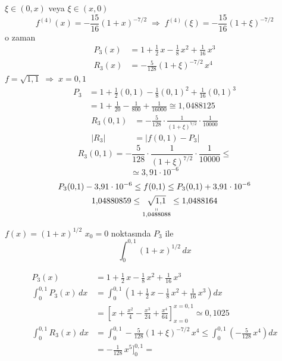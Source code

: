 \documentclass[11pt,a4paper]{article}
\begin{document}
\hfill $\xi \in (0,x)$ veya $\xi \in (x,0)$
\[
  f^{(4)}(x) = -\frac{15}{16}(1+x)^{-7/2} \;\Rightarrow\; f^{(4)}(\xi) = -\frac{15}{16}(1+\xi)^{-7/2}
\]
o zaman
\begin{align*}
  P_3(x) &= 1 + \frac{1}{2}\,x - \frac{1}{8}\,x^2 + \frac{1}{16}\,x^3\\
  R_3(x) &= -\frac{5}{128}(1+\xi)^{-7/2}\,x^4
\end{align*}
$f = \sqrt{1{,}1} \;\Rightarrow\; x = 0{,}1$
\begin{align*}
  P_3 &= 1 + \frac{1}{2}(0{,}1) - \frac{1}{8}(0{,}1)^2 + \frac{1}{16}(0{,}1)^3\\
      &= 1 + \frac{1}{20} - \frac{1}{800} + \frac{1}{16000} \cong 1{,}0488125
\end{align*}
\begin{align*}
  R_3(0{,}1) &= -\frac{5}{128}\cdot\frac{1}{(1+\xi)^{7/2}}\cdot\frac{1}{10000}\\
  |R_3| &= |f(0{,}1) - P_3|
\end{align*}
\[
  R_3(0{,}1) = -\frac{5}{128}\cdot\frac{1}{(1+\boxed{\xi})^{7/2}}\cdot\frac{1}{10000} \le
\]
\hspace*{0.3\linewidth}{\small $\swarrow$ 0 veriyoruz en büyük hatayı bulmak için}
\[
  \simeq 3{,}91\cdot10^{-6}
\]
\begin{gather*}
  P_3(0{,}1) - 3{,}91\cdot10^{-6} \le f(0{,}1) \le P_3(0{,}1) + 3{,}91\cdot10^{-6}\\
  1{,}04880859 \le \underset{\substack{\shortparallel\\ 1{,}0488088}}{\sqrt{1{,}1}} \le 1{,}0488164
\end{gather*}

\begin{ornek}[5]
$f(x) = (1+x)^{1/2}$ \quad $x_0 = 0$ noktasında $P_3$ ile
\[
  \int_0^{0{,}1} (1+x)^{1/2}\,dx
\]
\end{ornek}

\begin{align*}
  P_3(x) &= 1 + \frac{1}{2}\,x - \frac{1}{8}\,x^2 + \frac{1}{16}\,x^3\\
  \int_0^{0{,}1} P_3(x)\,dx &= \int_0^{0{,}1}\left(1 + \frac{1}{2}\,x - \frac{1}{8}\,x^2 + \frac{1}{16}\,x^3\right)dx\\
  &= \left[x + \frac{x^2}{4} - \frac{x^3}{24} + \frac{x^4}{64}\right]_{x=0}^{x=0{,}1} \simeq 0{,}1025\\
  \int_0^{0{,}1} R_3(x)\,dx &= \int_0^{0{,}1} -\frac{5}{128}(1+\xi)^{-7/2}\,x^4
     \le \int_0^{0{,}1}\left(-\frac{5}{128}\,x^4\right)dx\\
  &= -\frac{1}{128}\,x^5\bigg]_0^{0{,}1} =
\end{align*}
\end{document}
